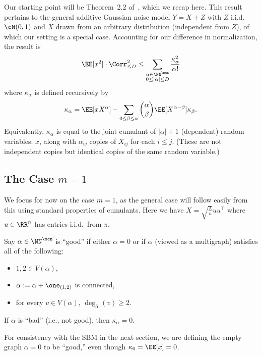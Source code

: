 \documentclass[11pt]{article}
\begin{document}
Our starting point will be Theorem~2.2 of~\cite{SW-estimation}, which we recap here. This result pertains to the general additive Gaussian noise model $Y = X+Z$ with $Z$ i.i.d.\ $\cN(0,1)$ and $X$ drawn from an arbitrary distribution (independent from $Z$), of which our setting is a special case. Accounting for our difference in normalization, the result is
\[ \EE[x^2] \cdot \Corr_{\le D}^2 \le \sum_{\substack{\alpha \in \NN^{\mcn} \\ 0 \le |\alpha| \le D}} \frac{\kappa_\alpha^2}{\alpha!} \]
where $\kappa_\alpha$ is defined recursively by
\[ \kappa_\alpha = \EE[x X^\alpha] - \sum_{0 \le \beta \lneq \alpha} \binom{\alpha}{\beta} \EE[X^{\alpha-\beta}] \kappa_\beta. \]
Equivalently, $\kappa_\alpha$ is equal to the joint cumulant of $|\alpha|+1$ (dependent) random variables: $x$, along with $\alpha_{ij}$ copies of $X_{ij}$ for each $i \le j$. (These are not independent copies but identical copies of the same random variable.)

\subsection{The Case $m=1$}

We focus for now on the case $m=1$, as the general case will follow easily from this using standard properties of cumulants. Here we have $X = \sqrt{\frac{\lambda}{n}}uu^\top$ where $u \in \RR^n$ has entries i.i.d.\ from $\pi$.

\begin{definition}
\label{def:good:SW}
Say $\alpha \in \NN^{\mcn}$ is ``good'' if either $\alpha = 0$ or if $\alpha$ (viewed as a multigraph) satisfies all of the following:
\begin{itemize}
    \item $1,2 \in V(\alpha)$,
    \item $\bar\alpha := \alpha + \one_{(1,2)}$ is connected,
    \item for every $v \in V(\alpha)$, $\deg_{\bar\alpha}(v) \ge 2$.
\end{itemize}

\end{definition}

\begin{lemma}
If $\alpha$ is ``bad'' (i.e., not good), then $\kappa_\alpha = 0$.
\end{lemma}

\noindent For consistency with the SBM in the next section, we are defining the empty graph $\alpha = 0$ to be ``good,'' even though $\kappa_0 = \EE[x] = 0$.
\end{document}
